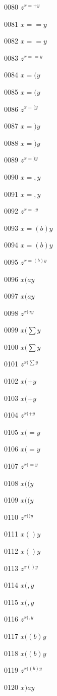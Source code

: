 \documentclass{article}
\begin{document}
0080 $z^{x=+y}$\par
0081 $\displaystyle x==y$\par
0082 $x==y$\par
0083 $z^{x==y}$\par
0084 $\displaystyle x=(y$\par
0085 $x=(y$\par
0086 $z^{x=(y}$\par
0087 $\displaystyle x=)y$\par
0088 $x=)y$\par
0089 $z^{x=)y}$\par
0090 $\displaystyle x=,y$\par
0091 $x=,y$\par
0092 $z^{x=,y}$\par
0093 $\displaystyle x=\left(b\right) y$\par
0094 $x=\left(b\right) y$\par
0095 $z^{x=\left(b\right) y}$\par
0096 $\displaystyle x(ay$\par
0097 $x(ay$\par
0098 $z^{x(ay}$\par
0099 $\displaystyle x(\sum y$\par
0100 $x(\sum y$\par
0101 $z^{x(\sum y}$\par
0102 $\displaystyle x(+y$\par
0103 $x(+y$\par
0104 $z^{x(+y}$\par
0105 $\displaystyle x(=y$\par
0106 $x(=y$\par
0107 $z^{x(=y}$\par
0108 $\displaystyle x((y$\par
0109 $x((y$\par
0110 $z^{x((y}$\par
0111 $\displaystyle x()y$\par
0112 $x()y$\par
0113 $z^{x()y}$\par
0114 $\displaystyle x(,y$\par
0115 $x(,y$\par
0116 $z^{x(,y}$\par
0117 $\displaystyle x(\left(b\right) y$\par
0118 $x(\left(b\right) y$\par
0119 $z^{x(\left(b\right) y}$\par
0120 $\displaystyle x)ay$\par
\end{document}
